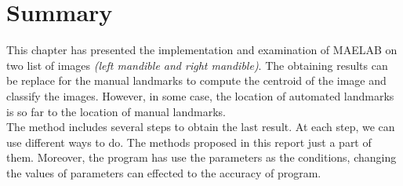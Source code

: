 \section{Summary}
This chapter has presented the implementation and examination of MAELAB on two list of images \textit{(left mandible and right mandible)}. The obtaining results can be replace for the manual landmarks to compute the centroid of the image and classify the images. However, in some case, the location of automated landmarks is so far to the location of manual landmarks.\\[0.2cm]
The method includes several steps to obtain the last result. At each step, we can use different ways to do. The methods proposed in this report just a part of them. Moreover, the program has use the parameters as the conditions, changing the values of parameters can effected to the accuracy of program.